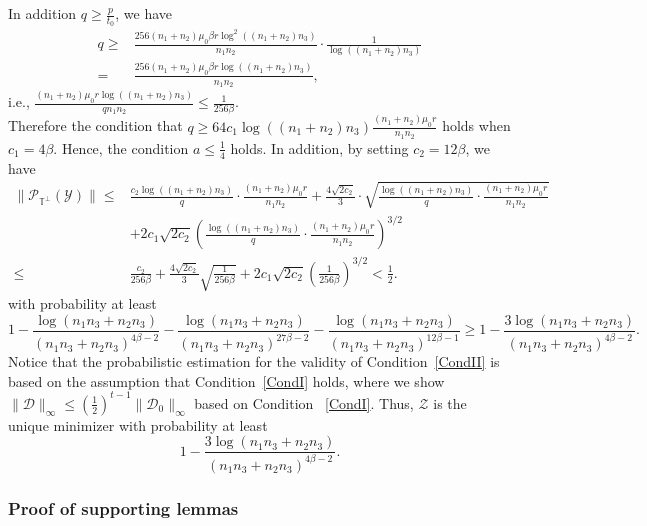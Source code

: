 \documentclass[twoside,12pt]{article}
\begin{document}
 In addition   $q\geq   \frac{p}{t_0}$, we have
\begin{align*}
    q\geq  & \frac{256(n_1+n_2)\mu_0\beta r\log^2((n_1+n_2)n_3)}{n_1n_2}\cdot\frac{1}{\log\left(    (n_1+n_2)n_3\right)}\\
=&\frac{256(n_1+n_2)\mu_0\beta r\log((n_1+n_2)n_3)}{n_1n_2},
\end{align*}
i.e., $\frac{(n_1+n_2)\mu_0r\log((n_1+n_2)n_3)}{qn_1n_2}\leq \frac{1}{256\beta}$. \\
Therefore the condition that  $q\geq 64c_1\log((n_1+n_2)n_3)\frac{(n_1+n_2)\mu_0r}{n_1n_2}$ holds when $c_1=4\beta$. Hence, the condition   $a\leq \frac 1 4$ holds. In addition, by setting $c_2=12\beta$, we have
\begin{align*}
\|\mathcal{P}_{\mathbb{T}^{\perp}}\left(\mathcal{Y}\right)\|
    \leq &\frac{c_{2}\log((n_1+n_2)n_3)}{q}\cdot \frac{(n_1+n_2)\mu_{0}r}{n_{1}n_{2}}
    +\frac{4\sqrt{2c_2}}{3}\cdot\sqrt{\frac{\log((n_1+n_2)n_3)}{q}  \cdot\frac{ (n_1+n_2)\mu_0r}{ n_1n_2}} \\
&+2c_1\sqrt{2c_2}\left(\frac{\log((n_1+n_2)n_3)}{q}     \cdot \frac{ (n_1+n_2)\mu_{0}r}{n_{1}n_{2}}\right)^{3/2}\\
    \leq&\frac{c_2}{256\beta}+\frac{4\sqrt{2c_2}}{3}\sqrt{\frac{1}{256\beta}}+2c_1\sqrt{2c_2}\left(\frac{1}{256\beta}\right)^{3/2} <\frac{1}{2}.
\end{align*}
with probability at least
\begin{equation}\label{prob:conditionII(b)}
1-  \frac{\log(n_1n_3+n_2n_3)}{(n_1n_3+n_2n_3)^{4\beta-2}}-\frac{\log(n_1n_3+n_2n_3)}{(n_1n_3+n_2n_3)^{27\beta-2}} 
 -\frac{\log(n_1n_3+n_2n_3)} {(n_1n_3+n_2n_3)^{12\beta-1}}
 \geq 1-  \frac{3\log(n_1n_3+n_2n_3)}{(n_1n_3+n_2n_3)^{4\beta-2}}.
 \end{equation}
Notice that the probabilistic estimation for the validity of Condition~\ref{CondII} is based on the assumption that  Condition~\ref{CondI} holds, where we show $\|\mathcal{D}\|_{\infty} \leq (\frac{1}{2})^{t-1}\|\mathcal{D}_0\|_{\infty}$ based on  Condition ~\ref{CondI}. Thus, $\mathcal{Z}$ is the unique minimizer with probability at least \[1-  \frac{3\log(n_1n_3+n_2n_3)}{(n_1n_3+n_2n_3)^{4\beta-2}}.\]
\subsubsection{\textnormal{Proof of supporting lemmas}}\label{proofsoflemmas}
\end{document}
